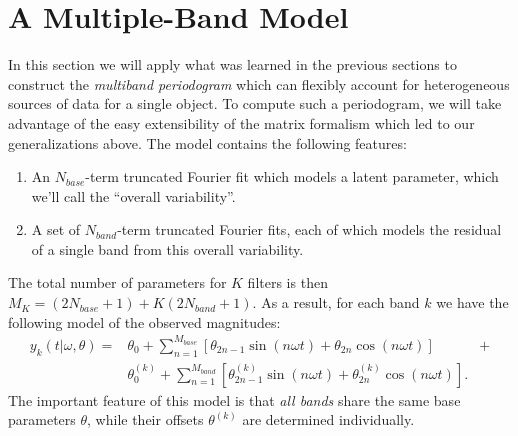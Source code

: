 \documentclass[12pt,preprint]{aastex}
\newcommand{\eqlabel}[1]{\label{eq:#1}}
\newcommand{\sectlabel}[1]{\label{sect:#1}}
\begin{document}
\section{A Multiple-Band Model}
\sectlabel{multiband}
In this section we will apply what was learned in the previous sections to construct the {\it multiband periodogram} which can flexibly account for heterogeneous sources of data for a single object.
To compute such a periodogram, we will take advantage of the easy extensibility of the matrix formalism which led to our generalizations above.
The model contains the following features:
\begin{enumerate}
  \item An $N_{base}$-term truncated Fourier fit which models a latent parameter, which we'll call the ``overall variability''.
  \item A set of $N_{band}$-term truncated Fourier fits, each of which models the residual of a single band from this overall variability.
\end{enumerate}
The total number of parameters for $K$ filters is then $M_K = (2N_{base} + 1) + K(2N_{band} + 1)$. As a result, for each band $k$ we have the following model of the observed magnitudes:
\begin{eqnarray}
  \eqlabel{multiband_model}
  y_k(t|\omega,\theta) = &\theta_0 + \sum_{n=1}^{M_{base}} \left[\theta_{2n - 1}\sin(n\omega t) + \theta_{2n}\cos(n\omega t)\right]& +\nonumber\\ 
  &\theta^{(k)}_0 + \sum_{n=1}^{M_{band}} \left[\theta^{(k)}_{2n - 1}\sin(n\omega t) + \theta^{(k)}_{2n}\cos(n\omega t)\right].&
\end{eqnarray}
The important feature of this model is that {\it all bands} share the same base parameters $\theta$, while their offsets $\theta^{(k)}$ are determined individually.
\end{document}
